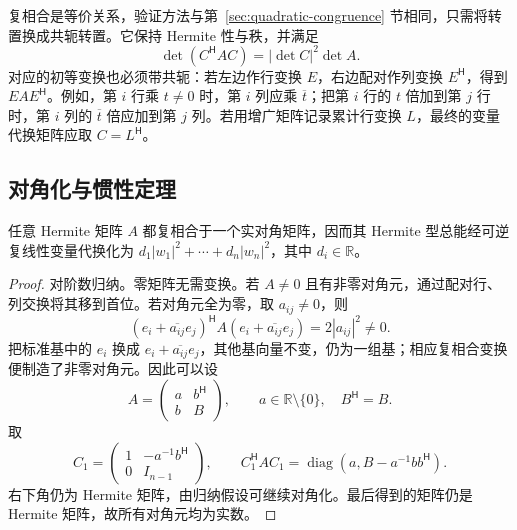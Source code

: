 复相合是等价关系，验证方法与第~\ref{sec:quadratic-congruence} 节相同，只需将转置换成共轭转置。它保持 Hermite 性与秩，并满足
\begin{equation}
\label{eq:hermitian-congruence-determinant}
    \det(C^{\mathsf H}AC)=|\det C|^2\det A.
\end{equation}
对应的初等变换也必须带共轭：若左边作行变换 $E$，右边配对作列变换 $E^{\mathsf H}$，得到 $EAE^{\mathsf H}$。例如，第 $i$ 行乘 $t\ne0$ 时，第 $i$ 列应乘 $\overline t$；把第 $i$ 行的 $t$ 倍加到第 $j$ 行时，第 $i$ 列的 $\overline t$ 倍应加到第 $j$ 列。若用增广矩阵记录累计行变换 $L$，最终的变量代换矩阵应取 $C=L^{\mathsf H}$。

\subsection{对角化与惯性定理}

\begin{theorem}
\label{thm:hermitian-congruence-diagonalization}
任意 Hermite 矩阵 $A$ 都复相合于一个实对角矩阵，因而其 Hermite 型总能经可逆复线性变量代换化为 $d_1|w_1|^2+\cdots+d_n|w_n|^2$，其中 $d_i\in\mathbb R$。
\end{theorem}
\begin{proof}
对阶数归纳。零矩阵无需变换。若 $A\ne0$ 且有非零对角元，通过配对行、列交换将其移到首位。若对角元全为零，取 $a_{ij}\ne0$，则
\[
    (e_i+\overline{a_{ij}}e_j)^{\mathsf H}
    A(e_i+\overline{a_{ij}}e_j)=2|a_{ij}|^2\ne0.
\]
把标准基中的 $e_i$ 换成 $e_i+\overline{a_{ij}}e_j$，其他基向量不变，仍为一组基；相应复相合变换便制造了非零对角元。因此可以设
\[
    A=\begin{pmatrix}a&b^{\mathsf H}\\b&B\end{pmatrix},
    \qquad a\in\mathbb R\setminus\{0\},\quad B^{\mathsf H}=B.
\]
取
\[
    C_1=\begin{pmatrix}1&-a^{-1}b^{\mathsf H}\\0&I_{n-1}\end{pmatrix},
    \qquad
    C_1^{\mathsf H}AC_1
      =\operatorname{diag}(a,B-a^{-1}bb^{\mathsf H}).
\]
右下角仍为 Hermite 矩阵，由归纳假设可继续对角化。最后得到的矩阵仍是 Hermite 矩阵，故所有对角元均为实数。
\end{proof}

